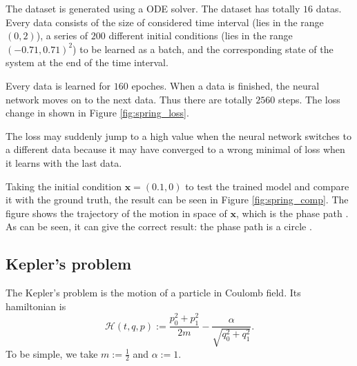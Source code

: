 \documentclass{article}
\begin{document}
The dataset is generated using a ODE solver.
The dataset has totally $16$ datas.
Every data consists of the size of considered time interval
(lies in the range $\left(0,2\right)$),
a series of $200$ different initial conditions
(lies in the range $\left(-0.71,0.71\right)^2$)
to be learned as a batch,
and the corresponding state of the system at the end of the time interval.

Every data is learned for $160$ epoches.
When a data is finished, the neural network moves on to the next data.
Thus there are totally $2560$ steps.
The loss change in shown in Figure \ref{fig:spring_loss}.

The loss may suddenly jump to a high value when the neural network switches to a different data
because it may have converged to a wrong minimal of loss when it learns with the last data.

Taking the initial condition $\mathbf x=\left(0.1,0\right)$
to test the trained model and compare it with the ground truth,
the result can be seen in Figure \ref{fig:spring_comp}.
The figure shows the trajectory of the motion in space of $\mathbf x$,
which is the phase path \cite[p. 146]{landau1976mechanics}\cite[p. 68]{arnold1989mathmech}.
As can be seen, it can give the correct result:
the phase path is a circle \cite[p. 17]{arnold1989mathmech}.

\subsection{Kepler's problem}

The Kepler's problem is the motion of a particle in Coulomb field.
Its hamiltonian is
\begin{equation*}
	\mathcal H\left(t,q,p\right):=\frac{p_0^2+p_1^2}{2m}-\frac\alpha{\sqrt{q_0^2+q_1^2}}.
\end{equation*}
To be simple, we take $m:=\frac12$ and $\alpha:=1$.



\end{document}
